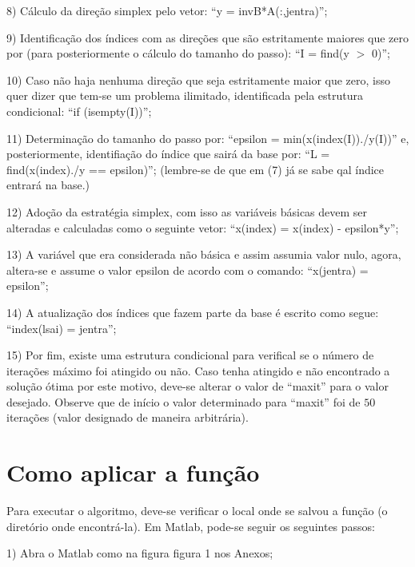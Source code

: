 \documentclass[10pt]{article}
\begin{document}
8) Cálculo da direção simplex pelo vetor: ``y = invB*A(:,jentra)''; 
\newline

9) Identificação dos índices com as direções que são estritamente maiores que zero por (para posteriormente o cálculo do tamanho do passo): ``I = find(y $>$ 0)'';
\newline

10) Caso não haja nenhuma direção que seja estritamente maior que zero, isso quer dizer que tem-se um problema ilimitado, identificada pela estrutura condicional: ``if (isempty(I))'';
\newline

11) Determinação do tamanho do passo por: ``epsilon = min(x(index(I))./y(I))'' e, posteriormente, identifiação do índice que sairá da base por: ``L = find(x(index)./y == epsilon)''; (lembre-se de que em (7) já se sabe qal índice entrará na base.)
\newline

12) Adoção da estratégia simplex, com isso as variáveis básicas devem ser alteradas e calculadas como o seguinte vetor: ``x(index) = x(index) - epsilon*y'';
\newline

13) A variável que era considerada não básica e assim assumia valor nulo, agora, altera-se e assume o valor epsilon de acordo com o comando: ``x(jentra) = epsilon'';
\newline

14) A atualização dos índices que fazem parte da base é escrito como segue: ``index(lsai) = jentra'';
\newline

15) Por fim, existe uma estrutura condicional para verifical se o número de iterações máximo foi atingido ou não. Caso tenha atingido e não encontrado a solução ótima por este motivo, deve-se alterar o valor de ``maxit'' para o valor desejado. Observe que de início o valor determinado para ``maxit'' foi de $50$ iterações (valor designado de maneira arbitrária).
\newline
\section{Como aplicar a função}
Para executar o algoritmo, deve-se verificar o local onde se salvou a função (o diretório onde encontrá-la). Em Matlab, pode-se seguir os seguintes passos:
\newline

1) Abra o Matlab como na figura figura 1 nos Anexos;
\newline
\end{document}
